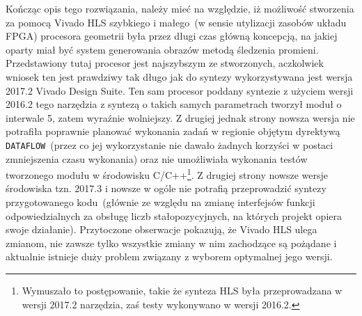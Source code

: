 Kończąc opis tego rozwiązania, należy mieć na względzie, iż możliwość stworzenia za pomocą Vivado HLS szybkiego i małego~(w sensie utylizacji zasobów układu FPGA) procesora geometrii była przez długi czas główną koncepcją, na jakiej oparty miał być system generowania obrazów metodą śledzenia promieni. Przedstawiony tutaj procesor jest najszybszym ze stworzonych, aczkolwiek wniosek ten jest prawdziwy tak długo jak do syntezy wykorzystywana jest wersja 2017.2 Vivado Design Suite. Ten sam procesor poddany syntezie z użyciem wersji 2016.2 tego narzędzia z syntezą o takich samych parametrach tworzył moduł o interwale 5, zatem wyraźnie wolniejszy. Z drugiej jednak strony nowsza wersja nie potrafiła poprawnie planować wykonania zadań w regionie objętym dyrektywą \texttt{DATAFLOW}~(przez co jej wykorzystanie nie dawało żadnych korzyści w postaci zmniejszenia czasu wykonania) oraz nie umożliwiała wykonania testów tworzonego modułu w środowisku C/C++\footnote{Wymuszało to postępowanie, takie że synteza HLS była przeprowadzana w wersji 2017.2 narzędzia, zaś testy wykonywano w wersji 2016.2.}. Z drugiej strony nowsze wersje środowiska tzn. 2017.3 i nowsze w ogóle nie potrafią przeprowadzić syntezy przygotowanego kodu~(głównie ze względu na zmianę interfejsów funkcji odpowiedzialnych za obsługę liczb stałopozycyjnych, na których projekt opiera swoje działanie). Przytoczone obserwacje pokazują, że Vivado HLS ulega zmianom, nie zawsze tylko wszystkie zmiany w nim zachodzące są pożądane i aktualnie istnieje duży problem związany z wyborem optymalnej jego wersji.


